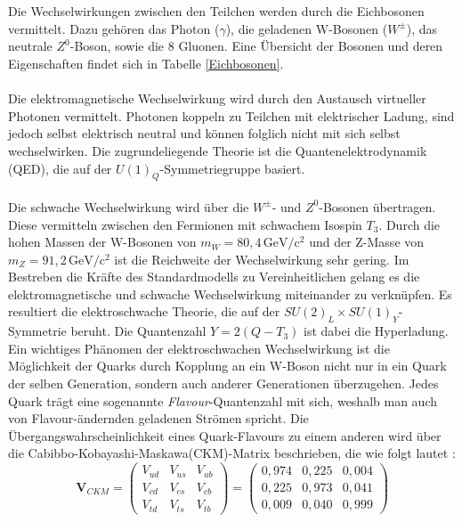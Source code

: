 \\
\\
Die Wechselwirkungen zwischen den Teilchen werden durch die Eichbosonen vermittelt. Dazu geh\"oren das Photon ($\gamma$), die geladenen W-Bosonen ($W^{\pm}$), das neutrale $Z^{0}$-Boson, sowie die 8 Gluonen.
Eine \"Ubersicht der Bosonen und deren Eigenschaften findet sich in Tabelle \ref{Eichbosonen}. \\
\\
Die elektromagnetische Wechselwirkung wird durch den Austausch virtueller Photonen vermittelt. Photonen koppeln zu Teilchen mit elektrischer Ladung, sind jedoch selbst elektrisch neutral und k\"onnen
folglich nicht mit sich selbst wechselwirken. Die zugrundeliegende Theorie ist die Quantenelektrodynamik (QED), die auf der $U(1)_{Q}$-Sym\-me\-trie\-grup\-pe basiert.\\
\\
Die schwache Wechselwirkung wird \"uber die $W^{\pm}$- und $Z^{0}$-Bosonen \"ubertragen. Diese vermitteln zwischen den Fermionen mit schwachem Isospin $T_{3}$. 
Durch die hohen Massen der W-Bosonen von $m_{W} = 80,4\,\mathrm{GeV/c^{2}}$ und der Z-Masse von $m_{Z} = 91,2\,\mathrm{GeV/c^{2}}$ ist die Reichweite der Wechselwirkung sehr gering.
Im Bestreben die Kr\"afte des Standardmodells zu Vereinheitlichen gelang es die elektromagnetische und schwache Wechselwirkung miteinander zu verkn\"upfen.
Es resultiert die elektroschwache Theorie, die auf der $SU(2)_{L}\times SU(1)_{Y}$-Symmetrie beruht. Die Quantenzahl $Y = 2(Q - T_{3})$ ist dabei die Hyperladung.\\
Ein wichtiges Ph\"anomen der elektroschwachen Wechselwirkung ist die M\"oglichkeit der Quarks durch Kopplung an ein W-Boson nicht nur in ein Quark der selben Generation, 
sondern auch anderer Generationen \"uberzugehen. Jedes Quark tr\"agt eine sogenannte \textit{Flavour}-Quantenzahl mit sich, weshalb man auch von Flavour-\"andernden geladenen Str\"omen spricht. 
Die \"Ubergangswahrscheinlichkeit eines Quark-Flavours zu einem anderen wird \"uber die Ca\-bibbo-\-Ko\-ba\-ya\-shi-\-Maska\-wa\-(CKM)-\-Matrix beschrieben, die wie folgt lautet \cite{pdg}:
\begin{equation}
\textbf{V}_{CKM}=\begin{pmatrix} V_{ud} & V_{us} & V_{ub} \\ V_{cd} & V_{cs} & V_{cb} \\ V_{td} & V_{ts} & V_{tb} \end{pmatrix}=\begin{pmatrix} 0,974 & 0,225 & 0,004 \\ 0,225 & 0,973 & 0,041 \\ 0,009 & 0,040 & 0,999 \end{pmatrix}
\label{CKMmatrix}
\end{equation}
